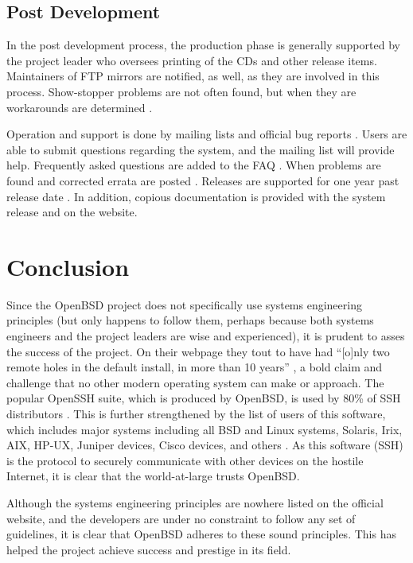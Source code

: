 \documentclass[12pt]{article}
\begin{document}
{\subsection*{Post Development}

In the post development process, the production phase is generally supported by the project leader who oversees printing of the CDs and other release items. Maintainers of FTP mirrors are notified, as well, as they are involved in this process. Show-stopper problems are not often found, but when they are workarounds are determined \cite{i386-cd-workaround}.

Operation and support is done by mailing lists \cite{mail} and official bug reports \cite{report}. Users are able to submit questions regarding the system, and the mailing list will provide help. Frequently asked questions are added to the FAQ \cite{faq}. When problems are found and corrected errata are posted \cite{patches}. Releases are supported for one year past release date \cite{lifecycle}. In addition, copious documentation is provided with the system release and on the website.

\section*{Conclusion}

Since the OpenBSD project does not specifically use systems engineering principles (but only happens to follow them, perhaps because both systems engineers and the project leaders are wise and experienced), it is prudent to asses the success of the project. On their webpage they tout to have had ``[o]nly two remote holes in the default install, in more than 10 years'' \cite{openbsd}, a bold claim and challenge that no other modern operating system can make or approach. The popular OpenSSH suite, which is produced by OpenBSD, is used by 80\% of SSH distributors \cite{openssh-usage}. This is further strengthened by the list of users of this software, which includes major systems including all BSD and Linux systems, Solaris, Irix, AIX, HP-UX, Juniper devices, Cisco devices, and others \cite{openssh-users}. As this software (SSH) is the protocol to securely communicate with other devices on the hostile Internet, it is clear that the world-at-large trusts OpenBSD.

Although the systems engineering principles are nowhere listed on the official website, and the developers are under no constraint to follow any set of guidelines, it is clear that OpenBSD adheres to these sound principles. This has helped the project achieve success and prestige in its field.

}
\end{document}
